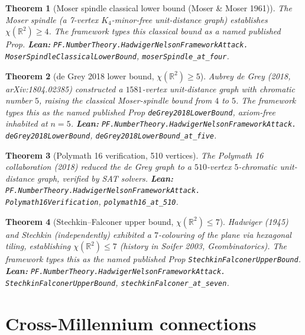 \documentclass[11pt,a4paper]{article}
\theoremstyle{plain}
\newtheorem{theorem}{Theorem}[section]
\theoremstyle{definition}
\begin{document}
\begin{theorem}[Moser spindle classical lower bound (Moser \& Moser 1961)]
\label{thm:moser}
The Moser spindle (a 7-vertex $K_{4}$-minor-free unit-distance graph)
establishes $\chi(\mathbb{R}^{2}) \ge 4$. The framework types this
classical bound as a named published Prop.
\textbf{Lean:}
\texttt{PF.NumberTheory.HadwigerNelsonFrameworkAttack.\\
MoserSpindleClassicalLowerBound},
\texttt{moserSpindle\_at\_four}.
\end{theorem}

\begin{theorem}[de Grey 2018 lower bound, $\chi(\mathbb{R}^{2}) \ge 5$]
\label{thm:deGrey}
Aubrey de Grey (2018, arXiv:1804.02385) constructed a $1581$-vertex
unit-distance graph with chromatic number $5$, raising the classical
Moser-spindle bound from $4$ to $5$. The framework types this as the
named published Prop \texttt{deGrey2018LowerBound}, axiom-free
inhabited at $n = 5$.
\textbf{Lean:}
\texttt{PF.NumberTheory.HadwigerNelsonFrameworkAttack.\\
deGrey2018LowerBound},
\texttt{deGrey2018LowerBound\_at\_five}.
\end{theorem}

\begin{theorem}[Polymath 16 verification, 510 vertices]
\label{thm:polymath16}
The Polymath 16 collaboration (2018) reduced the de Grey graph to a
$510$-vertex $5$-chromatic unit-distance graph, verified by SAT
solvers.
\textbf{Lean:}
\texttt{PF.NumberTheory.HadwigerNelsonFrameworkAttack.\\
Polymath16Verification},
\texttt{polymath16\_at\_510}.
\end{theorem}

\begin{theorem}[Stechkin--Falconer upper bound, $\chi(\mathbb{R}^{2}) \le 7$]
\label{thm:stechkin}
Hadwiger (1945) and Stechkin (independently) exhibited a $7$-colouring
of the plane via hexagonal tiling, establishing
$\chi(\mathbb{R}^{2}) \le 7$ (history in Soifer 2003,
\emph{Geombinatorics}). The framework types this as the named
published Prop \texttt{StechkinFalconerUpperBound}.
\textbf{Lean:}
\texttt{PF.NumberTheory.HadwigerNelsonFrameworkAttack.\\
StechkinFalconerUpperBound},
\texttt{stechkinFalconer\_at\_seven}.
\end{theorem}

\section{Cross-Millennium connections}
\label{sec:cross}
\end{document}
